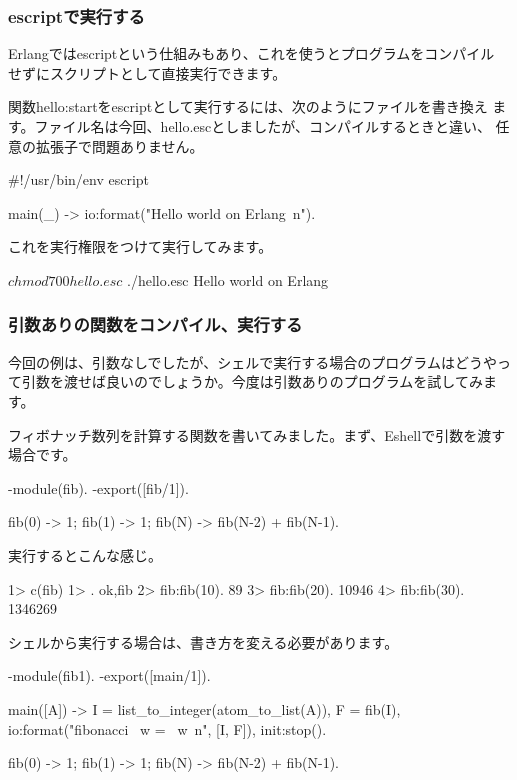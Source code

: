 \documentclass[mingoth,a4paper]{jsarticle}
\begin{document}
\subsubsection{escriptで実行する}
Erlangではescriptという仕組みもあり、これを使うとプログラムをコンパイル
せずにスクリプトとして直接実行できます。

関数hello:startをescriptとして実行するには、次のようにファイルを書き換え
ます。ファイル名は今回、hello.escとしましたが、コンパイルするときと違い、
任意の拡張子で問題ありません。
\begin{commandline}
#!/usr/bin/env escript

main(_) ->
    io:format("Hello world on Erlang~n").
\end{commandline}

これを実行権限をつけて実行してみます。
\begin{commandline}
$ chmod 700 hello.esc 
$ ./hello.esc 
Hello world on Erlang
\end{commandline}

\subsubsection{引数ありの関数をコンパイル、実行する}
今回の例は、引数なしでしたが、シェルで実行する場合のプログラムはどうやっ
て引数を渡せば良いのでしょうか。今度は引数ありのプログラムを試してみます。

フィボナッチ数列を計算する関数を書いてみました。まず、Eshellで引数を渡す場合です。
\begin{commandline}
-module(fib).
-export([fib/1]).

fib(0) -> 1;
fib(1) -> 1;
fib(N) ->
    fib(N-2) + fib(N-1).
\end{commandline}

実行するとこんな感じ。

\begin{commandline}
1> c(fib)
1> .
{ok,fib}
2> fib:fib(10).
89
3> fib:fib(20).
10946
4> fib:fib(30).
1346269
\end{commandline}

シェルから実行する場合は、書き方を変える必要があります。

\begin{commandline}
-module(fib1).
-export([main/1]).

main([A]) ->
    I = list_to_integer(atom_to_list(A)),
    F = fib(I),
    io:format("fibonacci ~w = ~w~n", [I, F]),
    init:stop().

fib(0) -> 1;
fib(1) -> 1;
fib(N) ->
    fib(N-2) + fib(N-1).
\end{commandline}
\end{document}
